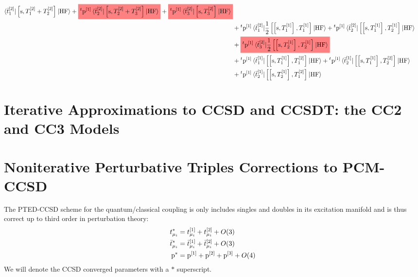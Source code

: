 \begin{equation}
\begin{aligned}
    \braket{\tbar{1}^{[2]} | \commutator{\s}{T_1^{[2]} + T_2^{[2]}} | \mathrm{HF}}
    +
    \highlight{red}{
    {}^t\p^{[1]}
    \braket{\tbar{2}^{[2]} | \commutator{\s}{T_2^{[2]} + T_3^{[2]}} | \mathrm{HF}}
    }
    +
    \highlight{red}{
    {}^t\p^{[1]}
    \braket{\tbar{3}^{[2]} | \commutator{\s}{T_3^{[2]}} | \mathrm{HF}}
    } \\
    &+
    {}^t\p^{[1]}
    \braket{\tbar{1}^{[2]} |
    \frac{1}{2}\commutator{\commutator{\s}{T_1^{[1]}}}{T_1^{[1]}}
    | \mathrm{HF}}
    +
    {}^t\p^{[1]}
    \braket{\tbar{2}^{[2]} |
    \commutator{\commutator{\s}{T_1^{[1]}}}{T_2^{[1]}}
    | \mathrm{HF}} \\
    &+
    \highlight{red}{
    {}^t\p^{[1]}
    \braket{\tbar{3}^{[2]} |
    \frac{1}{2}\commutator{\commutator{\s}{T_2^{[1]}}}{T_2^{[1]}}
    | \mathrm{HF}}
    } \\
    &+ {}^t\p^{[1]}
    \braket{\tbar{1}^{[1]} |
    \commutator{\commutator{\s}{T_1^{[1]}}}{T_1^{[2]}}
    | \mathrm{HF}}
    + {}^t\p^{[1]}
    \braket{\tbar{2}^{[1]} |
    \commutator{\commutator{\s}{T_1^{[1]}}}{T_2^{[2]}}
    | \mathrm{HF}} \\
    &+ {}^t\p^{[1]}
    \braket{\tbar{2}^{[1]} |
    \commutator{\commutator{\s}{T_2^{[1]}}}{T_1^{[2]}}
    | \mathrm{HF}}
  \end{aligned}
\end{equation}

\section[Iterative Approximations: CC2 and CC3]{Iterative Approximations to CCSD and CCSDT: the CC2 and CC3 Models}\label{sec:cc2-and-cc3}

\section[Noniterative Triples Corrections to PCM-CCSD]{
Noniterative Perturbative Triples Corrections to PCM-CCSD}\label{sec:ccsd-t-noniterative}

The \acs{PTED}-\acs{CCSD} scheme for the quantum/classical coupling is
only includes singles and doubles in its excitation manifold and is thus
correct up to third order in perturbation theory:
\begin{subequations}
  \begin{align}
    t_{\mu_i}^{*} &= t_{\mu_i}^{[1]} + t_{\mu_i}^{[2]} + O(3)
    \label{eq:tamp-star} \\
    \bar{t}_{\mu_i}^{*} &= \bar{t}_{\mu_i}^{[1]} + \bar{t}_{\mu_i}^{[2]} + O(3)
    \label{eq:tbar-star} \\
    \mathrm{p}^{*} &= \mathrm{p}^{[1]} + \mathrm{p}^{[2]} + \mathrm{p}^{[3]} + O(4)
    \label{eq:p-star}
  \end{align}
\end{subequations}
We will denote the \acs{CCSD} converged parameters with a $*$ superscript.

